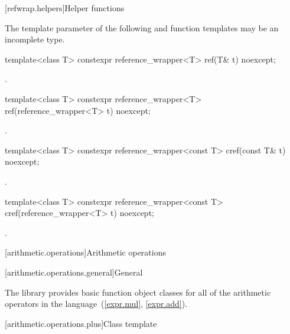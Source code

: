 [refwrap.helpers]{Helper functions}

\pnum
The template parameter  of
the following  and  function templates
may be an incomplete type.

%
\begin{itemdecl}
template<class T> constexpr reference_wrapper<T> ref(T& t) noexcept;
\end{itemdecl}

\begin{itemdescr}
\pnum
\returns
{}.
\end{itemdescr}

%
\begin{itemdecl}
template<class T> constexpr reference_wrapper<T> ref(reference_wrapper<T> t) noexcept;
\end{itemdecl}

\begin{itemdescr}
\pnum
\returns
{}.
\end{itemdescr}

%
\begin{itemdecl}
template<class T> constexpr reference_wrapper<const T> cref(const T& t) noexcept;
\end{itemdecl}

\begin{itemdescr}
\pnum
\returns
{}.
\end{itemdescr}

%
\begin{itemdecl}
template<class T> constexpr reference_wrapper<const T> cref(reference_wrapper<T> t) noexcept;
\end{itemdecl}

\begin{itemdescr}
\pnum
\returns
{}.
\end{itemdescr}

[arithmetic.operations]{Arithmetic operations}

[arithmetic.operations.general]{General}

\pnum
The library provides basic function object classes for all of the arithmetic
operators in the language~(\ref{expr.mul}, \ref{expr.add}).

[arithmetic.operations.plus]{Class template }

